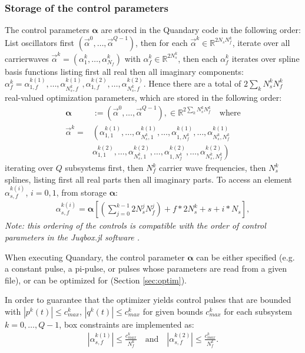 \documentclass[11pt]{article}
\newcommand{\R}{\mathds{R}}
\newcommand{\bfa}{\boldsymbol{\alpha}}
\newcommand{\bs}[1]{{\boldsymbol{#1}}}
\begin{document}
\subsubsection{Storage of the control parameters}

The control parameters $\bs{\alpha}$ are stored in the Quandary code in the following order: List oscillators first $(\vec{\alpha}^0, \dots, \vec{\alpha}^{Q-1})$, then for each $\vec{\alpha}^k \in
\R^{2N_sN_f^k}$, iterate over all carrierwaves $\vec{\alpha}^k =
(\alpha^k_1,\dots, \alpha^k_{N_f})$ with $\alpha^k_f \in \R^{2N_s^k}$, then each
$\alpha^k_f$ iterates over spline basis functions listing first all real then all imaginary 
components: $\alpha^k_f = \alpha^{k(1)}_{1,f}, \dots, \alpha^{k(1)}_{N_s^k,f}, \alpha^{k(2)}_{1,f}, \dots, \alpha^{k(2)}_{N_s^k,f}$. Hence there are a total of $2\sum_k N_s^kN_f^k$ real-valued optimization parameters, which are stored in the following order:
  \begin{align}
    \boldsymbol{\alpha} &:= \left( \vec{\alpha}^0, \dots, \vec{\alpha}^{Q-1} \right), \in
    \mathds{R}^{2\sum_k N_s^k N_f^k} \quad \text{where}\\
    \vec{\alpha}^k = &\left( \alpha_{1,1}^{k(1)},\dots, \alpha_{N_s^k,1}^{k(1)}, \dots, \alpha_{1,N_f^k}^{k(1)}, \dots, \alpha_{N_s^k,N_f^k}^{k(1)} \right.\\
                   &  \left. \alpha_{1,1}^{k(2)},\dots, \alpha_{N_s^k,1}^{k(2)}, \dots, \alpha_{1,N_f^k}^{k(2)}, \dots, \alpha_{N_s^k,N_f^k}^{k(2)} \right)
  \end{align}
  iterating over $Q$ subsystems first, then $N_f^k$ carrier wave frequencies, then $N_s^k$ splines, listing first all real parts then all imaginary parts. To access an element $\alpha_{s,f}^{k(i)}$, $i=0,1$, from storage $\bfa$:
  \begin{align}
    \alpha_{s,f}^{k(i)} = \bfa[ \left(\sum_{j=0}^{k-1} 2N_s^jN_f^j\right) + f*2N_s^k + s + i*N_s ],
  \end{align}
  \textit{Note: this ordering of the controls is compatible with the order of control parameters in the Juqbox.jl software \cite{petersson2021optimal}.}

  When executing Quandary, the control parameter $\boldsymbol{\alpha}$ can be either specified (e.g. a constant pulse, a pi-pulse, or 
  pulses whose parameters are read from a given file), or can be optimized for (Section \ref{sec:optim}). 
  
  In order to guarantee that the optimizer yields control pulses that are
  bounded with $|p^k(t)| \leq c^k_{max}$, $|q^k(t)| \leq c^k_{max}$ for given bounds $c^k_{max}$ for each  
  subsystem $k=0,\dots, Q-1$, box constraints are implemented as:
   \begin{align}
     | \alpha_{s,f}^{k(1)}| \leq \frac{c^k_{max}}{N_f^k} \quad \text{and} \quad |
     \alpha_{s,f}^{k(2)} | \leq \frac{c^k_{max}}{N_f^k}.
   \end{align}
\end{document}
